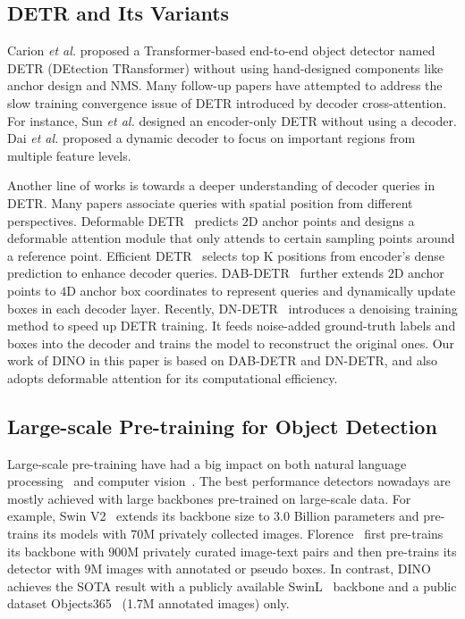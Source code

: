\documentclass[runningheads]{llncs}
\begin{document}
\subsection{DETR and Its Variants}
Carion \textit{et al.} \cite{carion2020end} proposed a Transformer-based end-to-end object detector named DETR (DEtection TRansformer) without using hand-designed components like anchor design and NMS. Many follow-up papers have attempted to address the slow training convergence issue of DETR introduced by decoder cross-attention. For instance, Sun \textit{et al.} \cite{sun2020rethinking} designed an encoder-only DETR without using a decoder. Dai \textit{et al.} \cite{dai2021dynamic} proposed a dynamic decoder to focus on important regions from multiple feature levels.

Another line of works is towards a deeper understanding of decoder queries in DETR. Many papers associate queries with spatial position from different perspectives. Deformable DETR~\cite{zhu2020deformable} predicts $2$D anchor points and designs a deformable attention module that only attends to certain sampling points around a reference point. Efficient DETR~\cite{yao2021efficient} selects top K positions from encoder's dense prediction to enhance decoder queries. DAB-DETR~\cite{liu2022dab} further extends $2$D anchor points to $4$D anchor box coordinates to represent queries and dynamically update boxes in each decoder layer. Recently, DN-DETR~\cite{li2022dn} introduces a denoising training method to speed up DETR training. It feeds noise-added ground-truth labels and boxes into the decoder and trains the model to reconstruct the original ones. Our work of DINO in this paper is based on DAB-DETR and DN-DETR, and also adopts deformable attention for its computational efficiency.

\subsection{Large-scale Pre-training for Object Detection}
Large-scale pre-training have had a big impact on both natural language processing~\cite{devlin2018bert} and computer vision~\cite{AlecRadford2021LearningTV}. The best performance detectors nowadays are mostly achieved with large backbones pre-trained on large-scale data. For example, Swin V2~\cite{liu2021swinv2} extends its backbone size to $3.0$ Billion parameters
and pre-trains its models with $70$M privately collected images.
Florence~\cite{yuan2021florence} first pre-trains its backbone with $900$M privately curated image-text pairs and then pre-trains its detector with $9$M images with annotated or pseudo boxes. In contrast, DINO achieves the SOTA result with a publicly available SwinL~\cite{liu2021swin} backbone and a public dataset Objects365~\cite{shao2019objects365} (1.7M annotated images) only.
\end{document}
